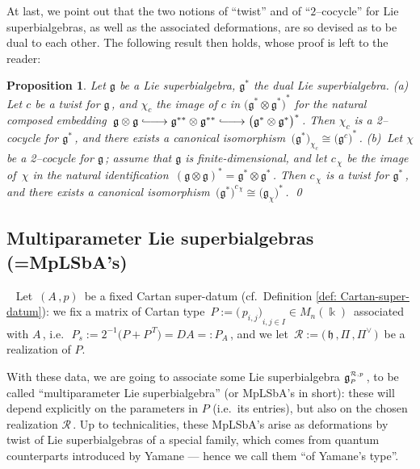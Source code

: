 \documentclass[12pt,reqno,twoside,a4paper]{amsart}
\numberwithin{equation}{section}
\newtheorem{prop}[lema]{Proposition}
\theoremstyle{definition}
\newtheorem{free text}[lema]{}
\theoremstyle{remark}
\newcommand{\R}{{\mathcal R}}
\def \Apicc {{\scriptscriptstyle A}}
\def \Ppicc {{\scriptscriptstyle P}}
\def \lieg{\mathfrak{g}}
\def \liegRpP{\mathfrak{g}^{\raise1pt\hbox{$ \scriptscriptstyle \mathcal{R},p $}}_\Ppicc}
\def \lieh{\mathfrak{h}}
\theoremstyle{plain}
\begin{document}
\vskip5pt

   At last, we point out that the two notions of ``twist'' and of
   ``$ 2 $--cocycle''  for Lie superbialgebras,
   as well as the associated deformations, are so devised as to be dual to each other.
   The following result then holds, whose proof is left to the reader:

\vskip7pt

\begin{prop}  \label{prop: duality-deforms x LbA's}
 Let  $ \lieg $  be a Lie superbialgebra,  $ \lieg^* $  the dual Lie superbialgebra.
%
 \vskip2pt
%
   {\it (a)}\,  Let  $ c $  be a twist for  $ \lieg \, $,  and  $ \chi_c $  the image of
   $ c $  in  $ {\big( \lieg^* \otimes \lieg^* \big)}^* $
   for the natural composed embedding
   $ \, \lieg \otimes \lieg \lhook\joinrel\relbar\joinrel\longrightarrow \lieg^{**}
   \otimes \lieg^{**} \lhook\joinrel\relbar\joinrel\longrightarrow {\big( \lieg^* \otimes \lieg^* \big)}^* \, $.
   Then  $ \chi_c $  is a 2--cocycle  for  $ \lieg^* \, $,  and there exists a canonical isomorphism
   $ \, {\big( \lieg^* \big)}_{\chi_c} \cong {\big( \lieg^c \big)}^* \, $.
%
 \vskip2pt
%
   {\it (b)}\,  Let  $ \chi $  be a 2--cocycle  for  $ \lieg \, $;  assume that
   $ \lieg $  is finite-dimensional, and let  $ c_{\,\chi} $  be the image of  $ \, \chi $
   in the natural identification  $ \, {(\lieg \otimes \lieg)}^* = \lieg^* \otimes \lieg^* \, $.
   Then  $ c_{\,\chi} $  is a twist for  $ \lieg^* \, $,
   and there exists a canonical isomorphism
   $ \, {\big( \lieg^* \big)}^{c_{\,\chi}} \cong {\big( \lieg_\chi \big)}^* \, $.
%
\qed
%
\end{prop}

\vskip17pt


\subsection{Multiparameter Lie superbialgebras (=MpLSbA's)}  \label{subsec: MpLSbA's}  {\ }
%
 \vskip5pt
%
   Let  $ \, (A \, , p) \, $  be a fixed Cartan super-datum (cf.\  Definition \ref{def: Cartan-super-datum}):  we fix a matrix of Cartan type  $ \, P := {\big(\, p_{i,j} \big)}_{i, j \in I} \in M_n(\Bbbk) \, $  associated with  $ A \, $,  i.e.\  $ \, P_s := 2^{-1} \big( P + P^{\,\scriptscriptstyle T} \big) = DA =: P_{\!\Apicc} \, $,  and we let  $ \, \R := \big(\, \lieh \, , \Pi \, , \Pi^\vee \,\big) \, $  be a realization of  $ P $.
                                                                     \par
   With these data, we are going to associate some Lie superbialgebra  $ \liegRpP \, $,
   to be called ``multiparameter Lie superbialgebra'' (or MpLSbA's in short): these will depend explicitly on the parameters in  $ P $
   (i.e.\ its entries), but also on the chosen realization  $ \R \, $.
   Up to technicalities, these MpLSbA's arise as deformations by twist of Lie superbialgebras of a special family,
   which comes from quantum counterparts introduced by Yamane   --- hence we call them ``of Yamane's type''.
\end{document}
